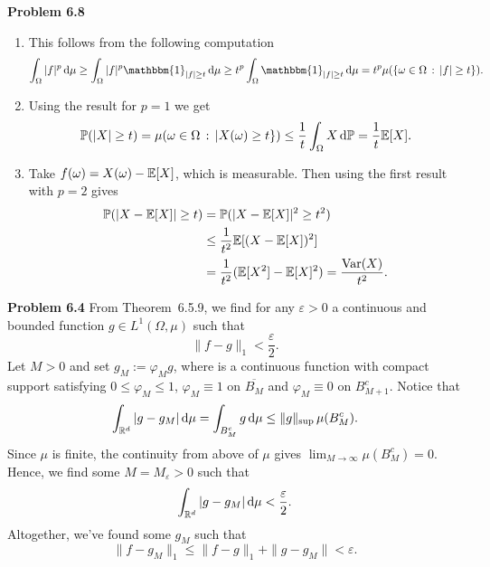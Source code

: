 \bigskip

\textbf{Problem 6.8}

\begin{enumerate}[label=(\alph*)]
\item This follows from the following computation
\[
	\int_\Omega |f|^p \, \dd \mu \ge \int_{\Omega} |f|^p \mathbbm{1}_{|f| \ge t} \, \dd \mu
	\ge t^p \int_\Omega \mathbbm{1}_{|f| \ge t} \, \dd \mu
	= t^p \mu(\{\omega \in \Omega \, : \, |f| \ge t\}).
\]
\item Using the result for $p = 1$ we get
\[
	\mathbb P(|X| \ge t) = \mu(\omega \in \Omega \, : \, |X(\omega) \ge t \})
	\le \frac{1}{t} \int_{\Omega} X \, \mathrm{d} \mathbb P = \frac{1}{t} \mathbb E[X].
\]
\item Take $f(\omega) = X(\omega) - \mathbb E[X]$, which is measurable. Then using the first result with $p = 2$ gives
\begin{align*}
	\mathbb P(|X - \mathbb E[X]| \ge t) &= \mathbb P(|X-\mathbb E[X]|^2 \ge t^2) \\
	&\le \frac{1}{t^2} \mathbb E[(X - \mathbb E[X])^2] \\
	&= \frac{1}{t^2} (\mathbb E[X^2] - \mathbb E[X]^2) = \frac{\mathrm{Var}(X)}{t^2}.
\end{align*}
\end{enumerate}




\textbf{Problem 6.4}
From Theorem~6.5.9, we find for any $\varepsilon>0$ a continuous and bounded function $g\in L^1(\Omega,\mu)$ such that
\[
	\|f-g\|_1 <\frac{\varepsilon}{2}.
\]
Let $M>0$ and set $g_M:= \varphi_M g$, where is a continuous function with compact support satisfying $0\le \varphi_M \le 1$, $\varphi_M\equiv 1$ on $\overline{B_M}$ and $\varphi_M\equiv 0$ on $B_{M+1}^c$. Notice that
	\begin{align*}
		\int_{\mathbb R^d} |g-g_M|\,\mathrm{d}\mu = \int_{B_M^c} g\,\mathrm{d}\mu \le \|g\|_{\sup}\,\mu(B_M^c).
	\end{align*}
Since $\mu$ is finite, the continuity from above of $\mu$ gives $\lim_{M\to\infty} \mu(B_{M}^c) = 0$. Hence, we find some $M=M_\varepsilon>0$ such that
\[
	\int_{\mathbb R^d} |g-g_M|\,\mathrm{d}\mu < \frac{\varepsilon}{2}.
\]
Altogether, we've found some $g_M$ such that
\[
	\|f-g_M\|_1 \le \|f-g\|_1 + \|g-g_M\| < \varepsilon.
\]
